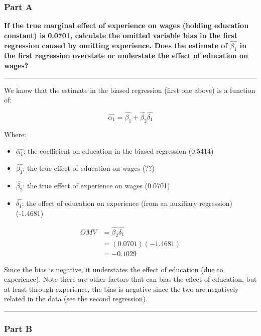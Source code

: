 \documentclass[
]{article}
\providecommand{\tightlist}{%
  \setlength{\itemsep}{0pt}\setlength{\parskip}{0pt}}
\begin{document}
\hypertarget{part-a-1}{%
\subsubsection{Part A}\label{part-a-1}}

\textbf{If the true marginal effect of experience on wages (holding
education constant) is 0.0701, calculate the omitted variable bias in
the first regression caused by omitting experience. Does the estimate of
\(\hat{\beta_1}\) in the first regression overstate or understate the
effect of education on wages?}

\begin{center}\rule{0.5\linewidth}{0.5pt}\end{center}

We know that the estimate in the biased regression (first one above) is
a function of:

\[\hat{\alpha_1}=\hat{\beta_1}+\hat{\beta_2}\hat{\delta_1}\]

Where:

\begin{itemize}
\tightlist
\item
  \(\hat{\alpha_1}\): the coefficient on education in the biased
  regression (0.5414)
\item
  \(\hat{\beta_1}\): the true effect of education on wages (??)
\item
  \(\hat{\beta_2}\): the true effect of experience on wages (0.0701)
\item
  \(\hat{\delta_1}\): the effect of education on experience (from an
  auxiliary regression) (-1.4681)
\end{itemize}

\[\begin{align*}
        OMV&=\hat{\beta_2} \hat{\delta_1}\\
        &=(0.0701)(-1.4681)\\
        &=-0.1029
\end{align*}\]

Since the bias is negative, it understates the effect of education (due
to experience). Note there are other factors that can bias the effect of
education, but at least through experience, the bias is negative since
the two are negatively related in the data (see the second regression).

\begin{center}\rule{0.5\linewidth}{0.5pt}\end{center}

\hypertarget{part-b-1}{%
\subsubsection{Part B}\label{part-b-1}}
\end{document}
